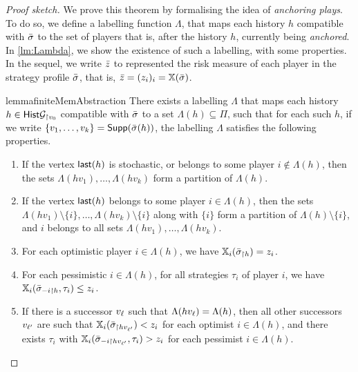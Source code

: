 \begin{proof}[Proof sketch]
We prove this theorem by formalising the idea of \emph{anchoring plays}.
To do so, we define a labelling function $\Lambda$, that maps each history $h$ compatible with ${\bar{\sigma}}$ to the set of players that is, after the history $h$, currently being \emph{anchored}. In \cref{lm:Lambda}, we show the existence of such a labelling, with some properties. 
In the sequel, we write $\bar{z}$ to represented the risk measure of each player in the strategy profile ${\bar{\sigma}}$, that is, $\bar{z} = (z_i)_i = \mathbb{X}({\bar{\sigma}})$.

     \begin{restatable}{lemma}{finiteMemAbstraction}\label{lm:Lambda}
        There exists a labelling $\Lambda$ that maps each history $h \in \mathsf{Hist}\mathcal{G}_{\upharpoonright v_0}$ compatible with ${\bar{\sigma}}$ to a set $\Lambda(h) \subseteq \Pi$, such that for each such $h$, if we write $\{v_1, \dots, v_k\} = \mathsf{Supp}({\bar{\sigma}}(h))$, the labelling $\Lambda$ satisfies the following properties.
        \begin{enumerate}
            \item\label{itm:splitsetsanchorwithouti} If the vertex $\mathsf{last}(h)$ is stochastic, or belongs to some player $i \not\in \Lambda(h)$, then the sets $\Lambda(hv_1), \dots, \Lambda(hv_k)$ form a partition of $\Lambda(h)$.

            \item\label{itm:splitsetsanchorwithi} If the vertex $\mathsf{last}(h)$ belongs to some player $i \in \Lambda(h)$, then the sets $\Lambda(hv_1) \setminus \{i\}, \dots, \Lambda(hv_k) \setminus \{i\}$ along with $\{i\}$ form a partition of $\Lambda(h) \setminus \{i\}$, and $i$ belongs to all sets $\Lambda(hv_1), \dots, \Lambda(hv_k)$.

            \item\label{itm:optimistanchor} For each optimistic player $i \in \Lambda(h)$, we have $\mathbb{X}_i({\bar{\sigma}}_{\upharpoonright h}) = z_i$.
            
            \item\label{itm:pessimistanchor} For each pessimistic $i \in \Lambda(h)$, for all strategies $\tau_i$ of player $i$, we have $\mathbb{X}_i({\bar{\sigma}}_{-i\upharpoonright h}, \tau_i) \leq z_i$.

            \item\label{itm:nosplit} If there is a successor $v_\ell$ such that $\Lambda(hv_\ell) = \Lambda(h)$, then all other successors $v_{\ell'}$ are such that $\mathbb{X}_i({\bar{\sigma}}_{\upharpoonright hv_{\ell'}}) < z_i$ for each optimist $i \in \Lambda(h)$, and there exists $\tau_i$ with $\mathbb{X}_i({\bar{\sigma}}_{-i\upharpoonright hv_{\ell'}}, \tau_i) > z_i$ for each pessimist $i \in \Lambda(h)$.
        \end{enumerate}
    \end{restatable}


\end{proof}
